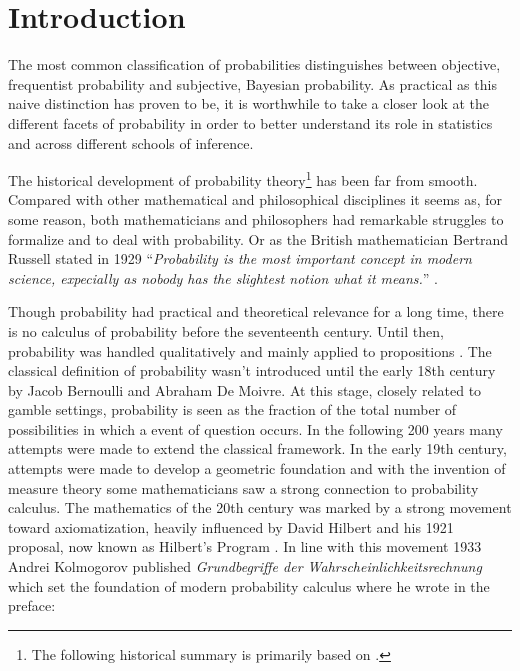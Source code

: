 \documentclass[
]{report}
\author{}
\date{}
\theoremstyle{definition}
\theoremstyle{definition}
\renewcommand*\contentsname{Table of contents}
\newcommand\contentsname{Table of contents}
\begin{document}
\renewcommand{\contentsname}{Contents}
\tableofcontents
{}

\newpage

\section{Introduction}

The most common classification of probabilities distinguishes between
objective, frequentist probability and subjective, Bayesian probability.
As practical as this naive distinction has proven to be, it is
worthwhile to take a closer look at the different facets of probability
in order to better understand its role in statistics and across
different schools of inference.

The historical development of probability
theory\footnote{The following historical summary is primarily based on \cite{shafer_origins_2018}.}
has been far from smooth. Compared with other mathematical and
philosophical disciplines it seems as, for some reason, both
mathematicians and philosophers had remarkable struggles to formalize
and to deal with probability. Or as the British mathematician Bertrand
Russell stated in 1929
``\textit{Probability is the most important concept in modern science, expecially as nobody has the slightest notion what it means.}''
\cite{sep-probability-interpret}.

Though probability had practical and theoretical relevance for a long
time, there is no calculus of probability before the seventeenth
century. Until then, probability was handled qualitatively and mainly
applied to propositions \cite{sep-probability-interpret}. The classical
definition of probability wasn't introduced until the early 18th century
by Jacob Bernoulli and Abraham De Moivre. At this stage, closely related
to gamble settings, probability is seen as the fraction of the total
number of possibilities in which a event of question occurs. In the
following 200 years many attempts were made to extend the classical
framework. In the early 19th century, attempts were made to develop a
geometric foundation and with the invention of measure theory some
mathematicians saw a strong connection to probability calculus. The
mathematics of the 20th century was marked by a strong movement toward
axiomatization, heavily influenced by David Hilbert and his 1921
proposal, now known as Hilbert's Program \cite{sep-hilbert-program}. In
line with this movement 1933 Andrei Kolmogorov published
\textit{Grundbegriffe der Wahrscheinlichkeitsrechnung} which set the
foundation of modern probability calculus where he wrote in the preface:
\end{document}
